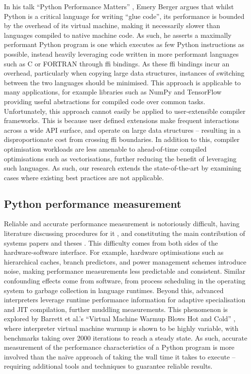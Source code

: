 In his talk ``Python Performance Matters'' \cite{emerybergerPythonPerformanceMatters2022}, Emery Berger argues that whilst Python is a critical language for writing ``glue code'', its performance is bounded by the overhead of its virtual machine, making it necessarily slower than languages compiled to native machine code.
As such, he asserts a maximally performant Python program is one which executes as few Python instructions as possible, instead heavily leveraging code written in more performant languages such as C or FORTRAN through \ac{ffi} bindings.
As these \ac{ffi} bindings incur an overhead, particularly when copying large data structures, instances of switching between the two languages should be minimised.
This approach is applicable to many applications, for example libraries such as NumPy and TensorFlow providing useful abstractions for compiled code over common tasks.
Unfortunately, this approach cannot easily be applied to user-extensible compiler frameworks. This is because user defined extensions make frequent interactions across a wide API surface, and operate on large data structures -- resulting in a disproportionate cost from crossing \ac{ffi} boundaries.
In addition to this, compiler optimisation workloads are less amenable to ahead-of-time compiled optimisations such as vectorisations, further reducing the benefit of leveraging such languages.
As such, our research extends the state-of-the-art by examining cases where existing best practices are not applicable.


\subsection{Python performance measurement}
\label{ssec:python-perf-measurement}

Reliable and accurate performance measurement is notoriously difficult, having literature discussing procedures for it \cite{harris2021understanding}, and constituting the main contribution of systems papers and theses \cite{crapeperformance}.
This difficulty comes from both sides of the hardware-software interface.
For example, hardware optimisations such as hierarchical caches, branch predictors, and power management schemes introduce noise, making performance measurements less predictable and consistent. Similar confounding effects come from software, from process scheduling in the operating system to garbage collection in language runtimes.
Beyond this, advanced interpreters leverage runtime performance information for adaptive specialisation and JIT compilation, further muddling measurements. This phenomenon is explored by Barrett et al.'s ``Virtual Machine Warmup Blows Hot and Cold'' \cite{barrettVirtualMachineWarmup2017}, where interpreter virtual machine warmup is shown to be highly variable, with benchmarks taking over 2000 iterations to reach a steady state.
As such, accurate measurement of the performance characteristics of a Python program is more involved than the na\"ive approach of taking the wall time it takes to execute -- requiring additional tools and techniques to guarantee reliable results.

